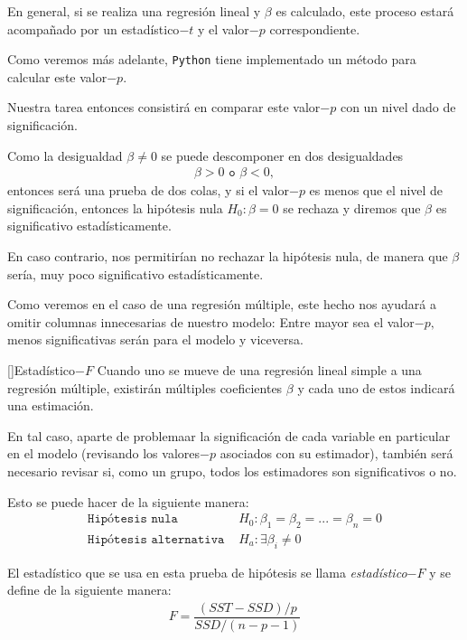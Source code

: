 En general, si se realiza una regresión lineal y $\beta $ es calculado, este proceso estará acompañado por un estadístico$-t$ y el valor$-p$ correspondiente.



Como veremos más adelante, \texttt{Python} tiene implementado un método para calcular este valor$-p$.



Nuestra tarea entonces consistirá en comparar este valor$-p$ con un nivel dado de significación.



Como la desigualdad $\beta\neq 0$ se puede descomponer en dos desigualdades
\begin{align}
 \beta>0 \texttt{ o }\beta<0,
\end{align}
entonces será una prueba de dos colas, y si el valor$-p$ es menos que el nivel de significación, entonces la hipótesis nula $H_{0}: \beta = 0$ se rechaza y diremos que $\beta$ es significativo estadísticamente.



En caso contrario, nos permitirían no rechazar la hipótesis nula, de manera que $\beta$ sería, muy poco significativo estadísticamente.



Como veremos en el caso de una regresión múltiple, este hecho nos ayudará a omitir columnas innecesarias de nuestro modelo: Entre mayor sea el valor$-p,$ menos significativas serán para el modelo y viceversa.


[]{Estadístico$-F$}
Cuando uno se mueve de una regresión lineal simple a una regresión múltiple, existirán múltiples coeficientes $\beta$ y cada uno de estos indicará una estimación.



En tal caso, aparte de problemaar la significación de cada variable en particular en el modelo (revisando los valores$-p$ asociados con su estimador), también será necesario revisar si, como un grupo, todos los estimadores son significativos o no.




Esto se puede hacer de la siguiente manera:
\begin{align}
 \texttt{Hipótesis nula }& H_{0}:\beta_{1}=\beta_{2}=...=\beta_{n}=0 \\
 \texttt{Hipótesis alternativa }& H_{a}: \exists \beta_{i}\neq 0
\end{align}



El estadístico que se usa en esta prueba de hipótesis se llama \emph{estadístico$-F$} y se define de la siguiente manera:
\begin{align}
 F = \dfrac{\left( SST -SSD \right)/p}{SSD/\left( n-p-1 \right)}
\end{align}



